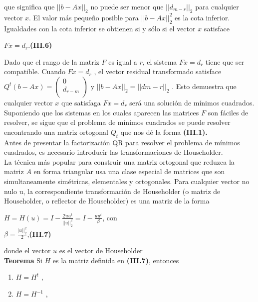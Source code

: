 \documentclass[twocolumn,twoside]{article}
\begin{document}
que significa que $||b-Ax||_{2}$  no puede ser menor que $||d_{m-r} ||_2$  para cualquier vector $x$.
El valor m\'as peque\~no posible para $||b-Ax||_{2}^{2}$ es la cota inferior. Igualdades con la cota
inferior se obtienen si y s\'olo si el vector $x$ satisface
\begin{center}
  $F x = d_r$.\hspace{3cm}\textbf{(III.6)}
\end{center}
Dado que el rango de la matriz $F$ es igual a $r$, el sistema $F x = d_r$ tiene que ser compatible.
Cuando $F x = d_r$ , el vector residual transformado satisface $Q^t(b - A x) = \left(\begin{array}{c}
  0\\ 
  d_{r-m}\\
 \end{array}\right)
$ y $||b - A x||_2 = ||d m-r ||_2$   . Esto demuestra que cualquier vector $x$ que satisfaga $F x = d_r$
ser\'a una soluci\'on de m\'inimos cuadrados. Suponiendo que los sistemas en los cuales
aparecen las matrices $F$ son f\'aciles de resolver, se sigue que el problema de m\'inimos
cuadrados se puede resolver encontrando una matriz ortogonal $Q_t$ que nos d\'e la forma
\textbf{(III.1).}\\
Antes de presentar la factorizaci\'on QR para resolver el problema de m\'inimos
cuadrados, es necesario introducir las transformaciones de Householder.\\
La t\'ecnica m\'as popular para construir una matriz ortogonal que reduzca la matriz $A$
en forma triangular usa una clase especial de matrices que son simultaneamente
sim\'etricas, elementales y ortogonales. Para cualquier vector no nulo u, la correspondiente 
transformaci\'on de Householder (o matriz de Householder, o reflector de
Householder) es una matriz de la forma
\begin{center}
  $H = H(u) = I -  \frac{2uu^t}{||u||_2^2} = I - \frac{uu^t}{\beta}$, con\vspace{0.2cm}\\ 
  $  \beta = \frac{|u||_2^2}{2}  $,\hspace{2cm}\textbf{(III.7)}
\end{center}
donde el vector $u$ es el vector de Householder\\
 \textbf{Teorema}
Si $H$ es la matriz definida en \textbf{(III.7)}, entonces
\begin{enumerate}[nosep,label=\arabic*)]
  \item $H = H^t$ ,
  \item $H = H^{-1}$ ,
\end{enumerate}
\end{document}
